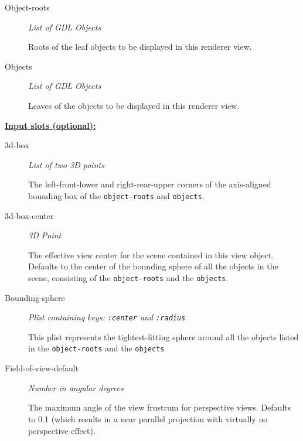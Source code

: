 \documentclass [11pt]{book}
\begin{document}
\begin{itemize}
\begin{description}
\item [Object-roots]
\emph{List of GDL Objects}

 Roots of the leaf objects to be displayed in this renderer view.




\item [Objects]
\emph{List of GDL Objects}

 Leaves of the objects to be displayed in this renderer view.




\end{description}






\textbf{
\underline{Input slots (optional):}}

\begin{description}

\item [3d-box]
\emph{List of two 3D points}

 The left-front-lower and right-rear-upper corners of the axis-aligned bounding
box of the \texttt{object-roots} and \texttt{objects}.




\item [3d-box-center]
\emph{3D Point}

 The effective view center for the scene contained in this view object. Defaults to the center of the bounding sphere of all
the objects in the scene, consisting of the \texttt{object-roots} and the \texttt{objects}.




\item [Bounding-sphere]
\emph{Plist containing keys: \texttt{:center} and \texttt{:radius}}

 This plist represents the tightest-fitting sphere
around all the objects listed in the \texttt{object-roots} and the \texttt{objects}




\item [Field-of-view-default]
\emph{Number in angular degrees}

 The maximum angle of the view frustrum for perspective views.
Defaults to 0.1 (which results in a near parallel projection with virtually no perspective effect).





\end{description}
\end{itemize}
\end{document}
